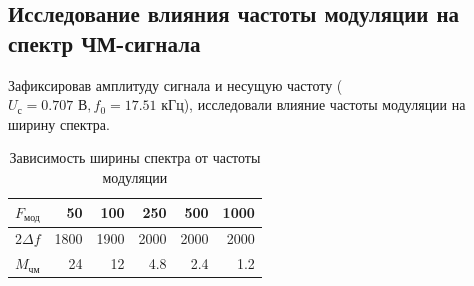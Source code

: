 \subsection{Исследование влияния частоты модуляции на спектр ЧМ-сигнала}
Зафиксировав амплитуду сигнала и несущую частоту ($U_\text{с}=0.707\text{ В}, f_0=17.51\text{ кГц}$), исследовали влияние частоты модуляции на ширину спектра.
\begin{table}[htbp]
  \centering
  \caption{Зависимость ширины спектра от частоты модуляции}
    \begin{tabular}{|l|r|r|r|r|r|}
    \toprule
    $F_\text{мод}$ & 50    & 100   & 250   & 500   & 1000 \\
    \midrule
    $2 \Delta f$ & 1800  & 1900  & 2000  & 2000  & 2000 \\
    \midrule
    $M_\text{чм}$ & 24    & 12    & 4.8   & 2.4   & 1.2 \\
    \bottomrule
    \end{tabular}%
  \label{tab:tab3}%
\end{table}%
